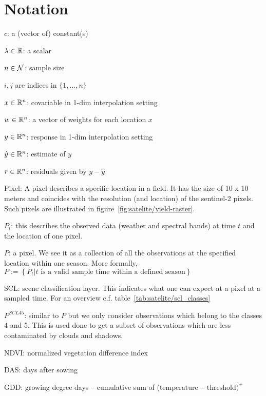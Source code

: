 \chapter*{Notation}
\label{c:Notation}

$c$: a (vector of) constant(s)

$\lambda \in \mathbb{R}$: a scalar

$n\in \operatorname{\mathcal{N}}$: sample size

$i,j$ are indices in $\{1,\dots,n\}$

$x\in \mathbb{R}^n$: covariable in 1-dim interpolation setting

$w \in \mathbb{R}^n$: a vector of weights for each location $x$

$y\in \mathbb{R}^n$: response in 1-dim interpolation setting

$\hat y\in \mathbb{R}^n$: estimate of $y$

$r \in \mathbb{R}^n$: residuals given by $y - \hat y$



Pixel: A pixel describes a specific location in a field. It has the size of 10 x 10 meters and coincides with the resolution (and location) of the sentinel-2 pixels. Such pixels are illustrated in figure~\ref{fig:satelite/yield-raster}.

$P_t$: this describes the observed data (weather and spectral bands) at time $t$ and the location of one pixel. 

$P$: a pixel. We see it as a collection of all the observations at the specified location within one season. More formally, $P := \left\{P_t | t\text{ is a valid sample time within a defined season}\right\}$

SCL: scene classification layer. This indicates what one can expect at a pixel at a sampled time. For an overview c.f. table~\ref{tab:satelite/scl_classes}

$P^{SCL45}$: similar to $P$ but we only consider observations which belong to the classes 4 and 5. This is used done to get a subset of observations which are less contaminated by clouds and shadows.

NDVI: normalized vegetation difference index

DAS: days after sowing

GDD: growing degree days -- cumulative sum of ($\text{temperature}-\text{threshold})^+$


